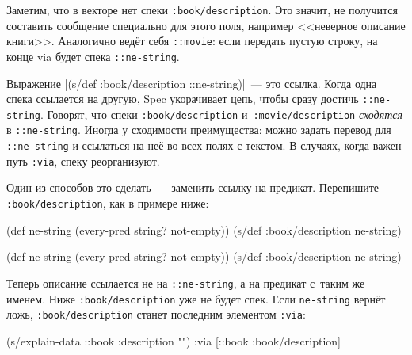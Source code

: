 \fi

Заметим, что в векторе нет спеки \texttt{:book/de\-scription}. Это значит, не
получится составить сообщение специально для этого поля, например <<неверное
описание книги>>. Аналогично ведёт себя \verb|::movie|: если передать
пустую строку, на конце via будет спека \verb|::ne-string|.

Выражение \spverb|(s/def :book/description ::ne-string)|~--- это
ссылка. Когда одна спека ссылается на другую, Spec укорачивает цепь, чтобы сразу
достичь \verb|::ne-string|. Говорят, что спеки \verb|:book/description|
и~\verb|:movie/description| \emph{сходятся} в \verb|::ne-string|. Иногда у
сходимости преимущества: можно задать перевод для \verb|::ne-string| и ссылаться
на неё во всех полях с текстом. В случаях, когда важен путь \verb|:via|, спеку
реорганизуют.

\mnoindent
Один из способов это сделать~--- заменить ссылку на предикат. Перепишите
\verb|:book/description|, как в примере ниже:

\ifx\devicetype\mobile

\begin{english}
  \begin{clojure}
(def ne-string
  (every-pred string? not-empty))
(s/def :book/description ne-string)
  \end{clojure}
\end{english}

\else

\begin{english}
  \begin{clojure}
(def ne-string (every-pred string? not-empty))
(s/def :book/description ne-string)
  \end{clojure}
\end{english}

\fi

\mnoindent
Теперь описание ссылается не на \verb|::ne-string|, а на предикат с~таким же
именем. Ниже \verb|:book/description| уже не будет спек. Если
\verb|ne-string| вернёт ложь, \verb|:book/description| станет последним
элементом \verb|:via|:

\ifx\devicetype\mobile

\begin{english}
  \begin{clojure}
(s/explain-data ::book
  {:description ""})
{:via [::book :book/description]}
  \end{clojure}
\end{english}

